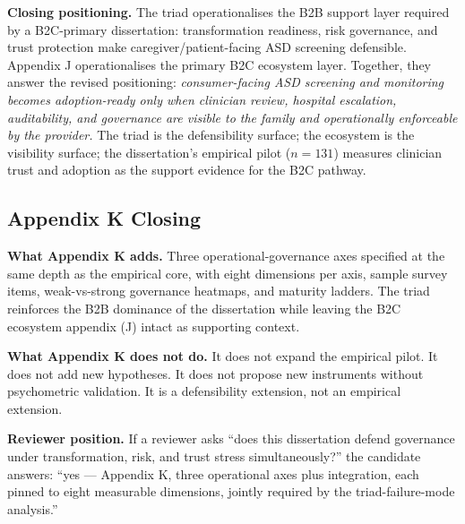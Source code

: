 \noindent\textbf{Closing positioning.} The triad operationalises the B2B support layer required by a B2C-primary dissertation: transformation readiness, risk governance, and trust protection make caregiver/patient-facing ASD screening defensible. Appendix J operationalises the primary B2C ecosystem layer. Together, they answer the revised positioning: \emph{consumer-facing ASD screening and monitoring becomes adoption-ready only when clinician review, hospital escalation, auditability, and governance are visible to the family and operationally enforceable by the provider.} The triad is the defensibility surface; the ecosystem is the visibility surface; the dissertation's empirical pilot ($n=131$) measures clinician trust and adoption as the support evidence for the B2C pathway.

\subsection*{Appendix K Closing}

\noindent\textbf{What Appendix K adds.} Three operational-governance axes specified at the same depth as the empirical core, with eight dimensions per axis, sample survey items, weak-vs-strong governance heatmaps, and maturity ladders. The triad reinforces the B2B dominance of the dissertation while leaving the B2C ecosystem appendix (J) intact as supporting context.

\noindent\textbf{What Appendix K does not do.} It does not expand the empirical pilot. It does not add new hypotheses. It does not propose new instruments without psychometric validation. It is a defensibility extension, not an empirical extension.

\noindent\textbf{Reviewer position.} If a reviewer asks ``does this dissertation defend governance under transformation, risk, and trust stress simultaneously?'' the candidate answers: ``yes --- Appendix K, three operational axes plus integration, each pinned to eight measurable dimensions, jointly required by the triad-failure-mode analysis.''

